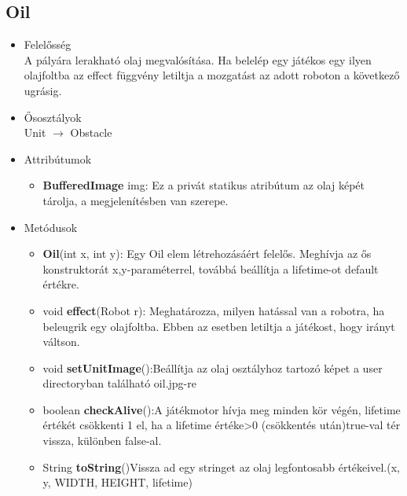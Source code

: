 \subsection{Oil}
\begin{itemize}
\item Felelősség\\
A pályára lerakható olaj megvalósítása. Ha belelép egy játékos egy ilyen olajfoltba az effect függvény letiltja a mozgatást az adott roboton a következő ugrásig.
\item Ősosztályok\\
Unit $\rightarrow$ Obstacle 
\item Attribútumok
	\begin{itemize}
		\item \textbf{BufferedImage} img: Ez a privát statikus atribútum az olaj képét tárolja,  a megjelenítésben van szerepe.
	\end{itemize}
\item Metódusok
	\begin{itemize}
		\item \textbf{Oil}(int x, int y): Egy Oil elem létrehozásáért felelős. Meghívja az ős konstruktorát x,y-paraméterrel, továbbá beállítja a lifetime-ot default értékre.
		\item void \textbf{effect}(Robot r): Meghatározza, milyen hatással van a robotra, ha beleugrik egy olajfoltba. Ebben az esetben letiltja a játékost, hogy irányt váltson.
			\item void \textbf{setUnitImage}():Beállítja az olaj osztályhoz tartozó képet a user directoryban található oil.jpg-re
				\item boolean \textbf{checkAlive}():A játékmotor hívja meg minden kör végén, lifetime értékét csökkenti 1 el, ha a lifetime értéke>0 (csökkentés után)true-val tér vissza, különben false-al.
		\item String \textbf{toString}()Vissza ad egy stringet az olaj legfontosabb értékeivel.(x, y, WIDTH, HEIGHT, lifetime)
	\end{itemize}
\end{itemize}

